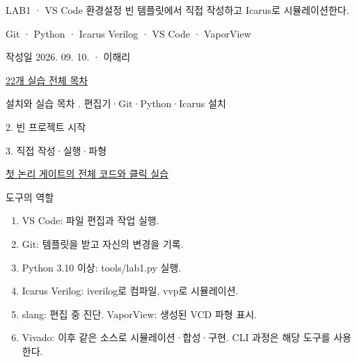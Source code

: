 
\renewcommand{\labonehome}{\hyperlink{vscode-install-contents}{\contentsbutton}}
\renewcommand{\legacySource}[1]{}
\providecommand{\terminalbox}[1]{\par\vspace{0.15cm}{\setlength{\fboxsep}{7pt}\colorbox{black}{\parbox{\dimexpr\textwidth-14pt\relax}{\color{white}\ttfamily\fontsize{7}{9}\selectfont #1}}}\par\vspace{0.15cm}}

\begingroup
\renewcommand{\small}{\fontsize{9}{11}\selectfont}
\begin{frame}{LAB1 · VS Code 환경설정}\relax
\small
빈 템플릿에서 직접 작성하고 Icarus로 시뮬레이션한다.\par\vspace{0.22cm}Git · Python · Icarus Verilog · VS Code · VaporView\par\vspace{0.22cm}작성일 2026. 09. 10. · 이해리\par\href{04.LAB1_00_CONTENTS.pdf}{22개 실습 전체 목차}
\end{frame}

\begin{frame}[label=vscode-install-contents]{설치와 실습 목차}\relax
\small
1. 편집기·Git·Python·Icarus 설치\par{}\par\vspace{0.4cm}2. 빈 프로젝트 시작\par{}\par\vspace{0.4cm}3. 직접 작성·실행·파형\par{}\par\vspace{0.4cm}\href{04.LAB1_01_LOGIC_GATES_VIVADO.pdf}{첫 논리 게이트의 전체 코드와 클릭 실습}
\end{frame}

\begin{frame}{도구의 역할}\relax
\small
\begin{enumerate}\setlength{\itemsep}{0.22cm}
\item VS Code: 파일 편집과 작업 실행.
\item Git: 템플릿을 받고 자신의 변경을 기록.
\item Python 3.10 이상: tools/lab1.py 실행.
\item Icarus Verilog: iverilog로 컴파일, vvp로 시뮬레이션.
\item slang: 편집 중 진단. VaporView: 생성된 VCD 파형 표시.
\item Vivado: 이후 같은 소스로 시뮬레이션·합성·구현. CLI 과정은 해당 도구를 사용한다.
\end{enumerate}

\end{frame}


